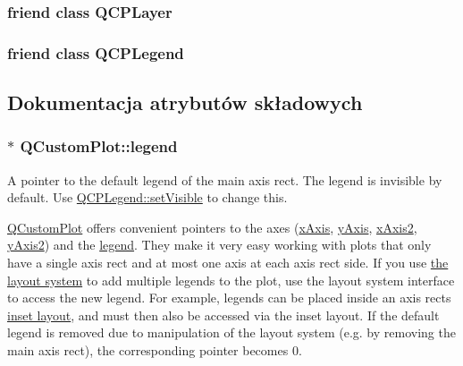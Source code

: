 \subsubsection[{\texorpdfstring{Q\+C\+P\+Layer}{QCPLayer}}]{\setlength{\rightskip}{0pt plus 5cm}friend class {\bf Q\+C\+P\+Layer}\hspace{0.3cm}{\ttfamily [friend]}}\hypertarget{class_q_custom_plot_a5dbf96bf7664c1b6fce49063eeea6eef}{}\label{class_q_custom_plot_a5dbf96bf7664c1b6fce49063eeea6eef}
\subsubsection[{\texorpdfstring{Q\+C\+P\+Legend}{QCPLegend}}]{\setlength{\rightskip}{0pt plus 5cm}friend class {\bf Q\+C\+P\+Legend}\hspace{0.3cm}{\ttfamily [friend]}}\hypertarget{class_q_custom_plot_a8429035e7adfbd7f05805a6530ad5e3b}{}\label{class_q_custom_plot_a8429035e7adfbd7f05805a6530ad5e3b}


\subsection{Dokumentacja atrybutów składowych}
\subsubsection[{\texorpdfstring{legend}{legend}}]{ $\ast$ Q\+Custom\+Plot\+::legend}\hypertarget{class_q_custom_plot_a4eadcd237dc6a09938b68b16877fa6af}{}\label{class_q_custom_plot_a4eadcd237dc6a09938b68b16877fa6af}
A pointer to the default legend of the main axis rect. The legend is invisible by default. Use \hyperlink{class_q_c_p_layerable_a3bed99ddc396b48ce3ebfdc0418744f8}{Q\+C\+P\+Legend\+::set\+Visible} to change this.

\hyperlink{class_q_custom_plot}{Q\+Custom\+Plot} offers convenient pointers to the axes (\hyperlink{class_q_custom_plot_a9a79cd0158a4c7f30cbc702f0fd800e4}{x\+Axis}, \hyperlink{class_q_custom_plot_af6fea5679725b152c14facd920b19367}{y\+Axis}, \hyperlink{class_q_custom_plot_ada41599f22cad901c030f3dcbdd82fd9}{x\+Axis2}, \hyperlink{class_q_custom_plot_af13fdc5bce7d0fabd640f13ba805c0b7}{y\+Axis2}) and the \hyperlink{class_q_custom_plot_a4eadcd237dc6a09938b68b16877fa6af}{legend}. They make it very easy working with plots that only have a single axis rect and at most one axis at each axis rect side. If you use \hyperlink{}{the layout system} to add multiple legends to the plot, use the layout system interface to access the new legend. For example, legends can be placed inside an axis rect\textquotesingle{}s \hyperlink{class_q_c_p_axis_rect_a4114887c7141b59650b7488f930993e5}{inset layout}, and must then also be accessed via the inset layout. If the default legend is removed due to manipulation of the layout system (e.\+g. by removing the main axis rect), the corresponding pointer becomes 0.

